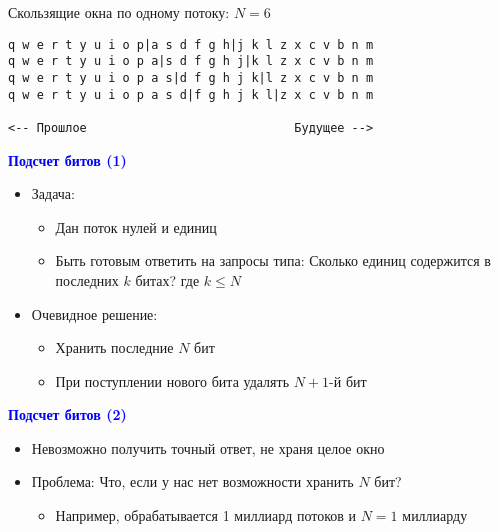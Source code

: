 \documentclass[landscape]{slides}
\begin{document}
\begin{normalsize}
\begin{slide}
Скользящие окна по одному потоку: $N=6$

\begin{verbatim}
q w e r t y u i o p|a s d f g h|j k l z x c v b n m
q w e r t y u i o p a|s d f g h j|k l z x c v b n m
q w e r t y u i o p a s|d f g h j k|l z x c v b n m
q w e r t y u i o p a s d|f g h j k l|z x c v b n m

<-- Прошлое                             Будущее -->
\end{verbatim}

\end{slide}


\begin{slide}
\textbf{\textcolor{blue}{Подсчет битов (1)}}

\begin{itemize}
\item Задача: 

  \begin{itemize}
  \item Дан поток нулей и единиц

  \item Быть готовым ответить на запросы типа: Сколько единиц содержится в последних $k$ битах? где $k \leq N$
  \end{itemize}

\item Очевидное решение: 

  \begin{itemize}
  \item Хранить последние $N$ бит

  \item При поступлении нового бита удалять $N+1$-й бит
  \end{itemize}
\end{itemize}
\end{slide}


\begin{slide}
\textbf{\textcolor{blue}{Подсчет битов (2)}}

\begin{itemize}
\item Невозможно получить точный ответ, не храня целое окно

\item Проблема: 
Что, если у нас нет возможности хранить $N$ бит?

  \begin{itemize}
  \item Например, обрабатывается 1 миллиард потоков и $N = 1$ миллиарду
  \end{itemize}


\end{itemize}
\end{slide}
\end{normalsize}
\end{document}
